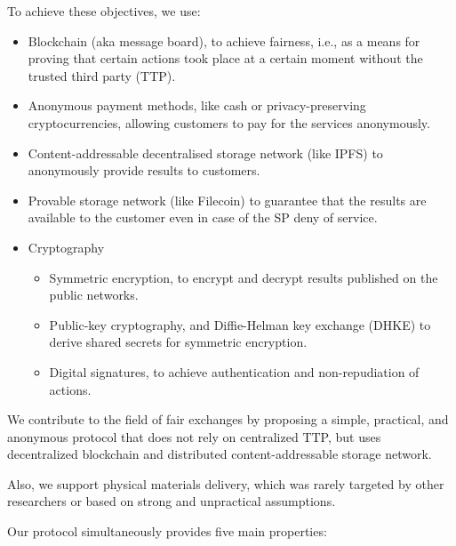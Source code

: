 \documentclass{ieeeaccess}
\begin{document}
To achieve these objectives, we use:
\begin{itemize}
    \item Blockchain (aka message board), to achieve fairness, i.e., as a means for proving that certain actions took place at a certain moment without the trusted third party (TTP).
    \item Anonymous payment methods, like cash or privacy-preserving cryptocurrencies, allowing customers to pay for the services anonymously.
    \item Content-addressable decentralised storage network (like IPFS) to anonymously provide results to customers. 
    \item Provable storage network (like Filecoin) to guarantee that the results are available to the customer even in case of the SP deny of service.
    \item Cryptography
    \begin{itemize}
        \item Symmetric encryption, to encrypt and decrypt results published on the public networks.
        \item Public-key cryptography, and Diffie-Helman key exchange (DHKE) to derive shared secrets for symmetric encryption.
        \item Digital signatures, to achieve authentication and non-repudiation of actions. 
    \end{itemize}
    
\end{itemize}


We contribute to the field of fair exchanges by proposing a simple, practical, and anonymous protocol that does not rely on centralized TTP, but uses decentralized blockchain and
distributed content-addressable storage network.

Also, we support physical materials delivery, which was rarely targeted by other researchers or based on strong and unpractical assumptions.

Our protocol simultaneously provides five main properties:
\end{document}
